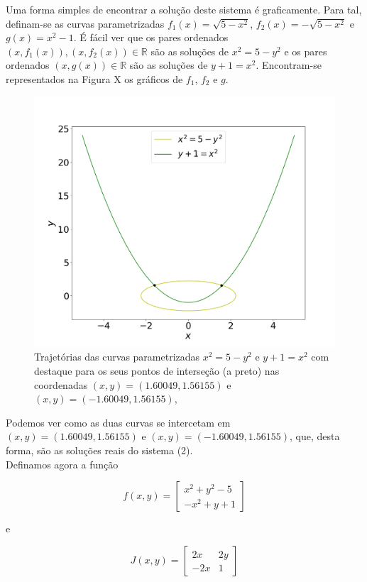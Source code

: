 \documentclass[aps,pre,twocolumn,showpacs,amsmath,amssymb]{revtex4-1}
\begin{document}
Uma forma simples de encontrar a solução deste sistema é graficamente. Para tal, definam-se as curvas parametrizadas $f_1(x)=\sqrt{5-x^2}$, $f_2(x)=-\sqrt{5-x^2}$ e $g(x)=x^2-1$. É fácil ver que os pares ordenados $(x,f_1(x)),(x,f_2(x))\in \mathbb{R}$ são as soluções de $x^2=5-y^2$ e os pares ordenados $(x,g(x))\in \mathbb{R}$ são as soluções de $y+1=x^2$. Encontram-se representados na Figura X os gráficos de $f_1$, $f_2$ e $g$.
\begin{figure}[hbt!]\vspace{-5ex}
  \includegraphics[width=\columnwidth]{graficosistema2.png}
  \caption{Trajetórias das curvas parametrizadas $x^2=5-y^2$ e $y+1=x^2$ com destaque para os seus pontos de interseção (a preto) nas coordenadas $(x,y)=(1.60049,1.56155)$ e $(x,y)=(-1.60049,1.56155)$,}
  \label{graficosistema2}
\end{figure}
Podemos ver como as duas curvas se intercetam em $(x,y)=(1.60049,1.56155)$ e $(x,y)=(-1.60049,1.56155)$, que, desta forma, são as soluções reais do sistema (2).\\
Definamos agora a função\\
\begin{minipage}[hbt!]{0.45\columnwidth}
$$f(x,y)=
\begin{bmatrix}
  x^2 + y^2 - 5\\
  -x^2 + y + 1
\end{bmatrix}
$$
\end{minipage}
e
\begin{minipage}[hbt!]{0.45\columnwidth}
$$J(x,y)=
\begin{bmatrix}
  2x & 2y\\
  -2x & 1
\end{bmatrix}
$$
\end{minipage}\\
\end{document}

